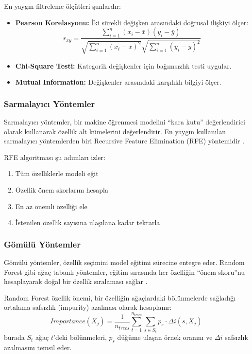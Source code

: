 \documentclass[conference]{IEEEtran}
\begin{document}
En yaygın filtreleme ölçütleri şunlardır:
\begin{itemize}
    \item \textbf{Pearson Korelasyonu:} İki sürekli değişken arasındaki doğrusal ilişkiyi ölçer:
    \begin{equation}
        r_{xy} = \frac{\sum_{i=1}^{n}(x_i - \bar{x})(y_i - \bar{y})}{\sqrt{\sum_{i=1}^{n}(x_i - \bar{x})^2}\sqrt{\sum_{i=1}^{n}(y_i - \bar{y})^2}}
    \end{equation}
    \item \textbf{Chi-Square Testi:} Kategorik değişkenler için bağımsızlık testi uygular.
    \item \textbf{Mutual Information:} Değişkenler arasındaki karşılıklı bilgiyi ölçer.
\end{itemize}

\subsubsection{Sarmalayıcı Yöntemler}

Sarmalayıcı yöntemler, bir makine öğrenmesi modelini ``kara kutu'' değerlendirici olarak kullanarak özellik alt kümelerini değerlendirir. En yaygın kullanılan sarmalayıcı yöntemlerden biri Recursive Feature Elimination (RFE) yöntemidir \cite{guyon2002gene}.

RFE algoritması şu adımları izler:
\begin{enumerate}
    \item Tüm özelliklerle modeli eğit
    \item Özellik önem skorlarını hesapla
    \item En az önemli özelliği ele
    \item İstenilen özellik sayısına ulaşılana kadar tekrarla
\end{enumerate}

\subsubsection{Gömülü Yöntemler}

Gömülü yöntemler, özellik seçimini model eğitimi sürecine entegre eder. Random Forest gibi ağaç tabanlı yöntemler, eğitim sırasında her özelliğin ``önem skoru''nu hesaplayarak doğal bir özellik sıralaması sağlar \cite{breiman2001random}.

Random Forest özellik önemi, bir özelliğin ağaçlardaki bölünmelerde sağladığı ortalama safsızlık (impurity) azalması olarak hesaplanır:
\begin{equation}
    Importance(X_j) = \frac{1}{n_{trees}} \sum_{t=1}^{n_{trees}} \sum_{s \in S_t} p_s \cdot \Delta i(s, X_j)
\end{equation}
burada $S_t$ ağaç $t$'deki bölünmeleri, $p_s$ düğüme ulaşan örnek oranını ve $\Delta i$ safsızlık azalmasını temsil eder.
\end{document}
